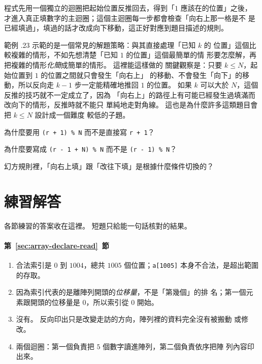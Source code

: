 程式先用一個獨立的迴圈把起始位置反推回去，得到「$1$ 應該在的位置」之後，
才進入真正填數字的主迴圈；這個主迴圈每一步都會檢查「向右上那一格是不
是已經填過」，填過的話才改成向下移動，這正好對應到題目描述的規則。


範例 \thechapter.23 示範的是一個常見的解題策略：與其直接處理「已知 $k$ 的
位置」這個比較複雜的情形，不如先想清楚「已知 $1$ 的位置」這個最簡單的情
形要怎麼解，再把複雜的情形\emph{化簡}成簡單的情形。 這裡能這樣做的
關鍵觀察是：只要 $k \le N$，起始位置到 $1$ 的位置之間就只會發生「向右上」
的移動、不會發生「向下」的移動，所以反向走 $k - 1$ 步一定能精確地推回
$1$ 的位置。 如果 $k$ 可以大於 $N$，這個反推的技巧就不一定成立了，因為
「向右上」的路徑上有可能已經發生過填滿而改向下的情形，反推時就不能只
單純地走對角線。 這也是為什麼許多這類題目會把 $k \le N$ 設計成一個難度
較低的子題。


\begin{drills}[label=drills:array-2d-magic-square]
\item 為什麼要用 \texttt{(r + 1) \% N} 而不是直接寫 \texttt{r + 1}？
\item 為什麼要寫成 \texttt{(r - 1 + N) \% N} 而不是 \texttt{(r - 1) \% N}？
\item 幻方規則裡，「向右上填」跟「改往下填」是根據什麼條件切換的？
\end{drills}

\section*{練習解答}

各節練習的答案收在這裡。 短題只給能一句話核對的結果。

\paragraph{第~\ref{sec:array-declare-read}~節}
\begin{enumerate}
\item 合法索引是 $0$ 到 $1004$，總共 $1005$ 個位置；\texttt{a[1005]}
本身不合法，是超出範圍的存取。
\item 因為索引代表的是離陣列開頭的\emph{位移量}，不是「第幾個」的排
名；第一個元素跟開頭的位移量是 $0$，所以索引從 $0$ 開始。
\item 沒有。 反向印出只是改變走訪的方向，陣列裡的資料完全沒有被搬動
或修改。
\item 兩個迴圈：第一個負責把 $5$ 個數字讀進陣列，第二個負責依序把陣
列內容印出來。
\end{enumerate}

